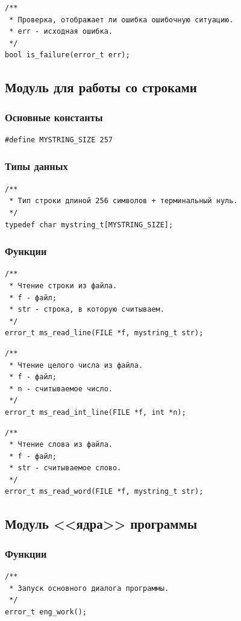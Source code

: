 \documentclass[a4paper,12pt]{extarticle}
\begin{document}
\begin{verbatim}
/**
 * Проверка, отображает ли ошибка ошибочную ситуацию.
 * err - исходная ошибка.
 */
bool is_failure(error_t err);
\end{verbatim}


\subsection{Модуль для работы со строками}
\subsubsection{Основные константы}
\begin{verbatim}
#define MYSTRING_SIZE 257
\end{verbatim}


\subsubsection{Типы данных}
\begin{verbatim}
/**
 * Тип строки длиной 256 символов + терминальный нуль.
 */
typedef char mystring_t[MYSTRING_SIZE];
\end{verbatim}

\subsubsection{Функции}
\begin{verbatim}
/**
 * Чтение строки из файла.
 * f - файл;
 * str - строка, в которую считываем.
 */
error_t ms_read_line(FILE *f, mystring_t str);
\end{verbatim}

\begin{verbatim}
/**
 * Чтение целого числа из файла.
 * f - файл;
 * n - считываемое число.
 */
error_t ms_read_int_line(FILE *f, int *n);
\end{verbatim}

\begin{verbatim}
/**
 * Чтение слова из файла.
 * f - файл;
 * str - считываемое слово.
 */
error_t ms_read_word(FILE *f, mystring_t str);
\end{verbatim}

\subsection{Модуль <<ядра>> программы}
\subsubsection{Функции}
\begin{verbatim}
/**
 * Запуск основного диалога программы.
 */
error_t eng_work();
\end{verbatim}
\end{document}
